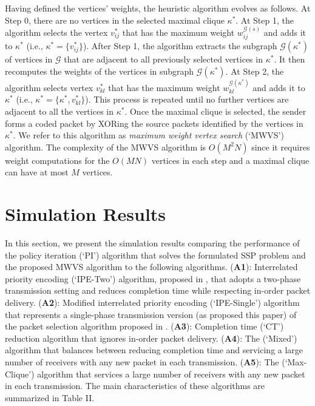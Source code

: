 \documentclass[12pt, peerreview, onecolumn]{IEEEtran}
\begin{document}
Having defined the vertices' weights,  the heuristic algorithm evolves  as follows. At Step 0,  there are no  vertices in the selected maximal clique $\kappa^*$. At Step 1, the algorithm selects the vertex $v_{ij}^*$ that has the maximum weight $w_{ij}^{\mathcal{G}(s)}$ and adds it to $\kappa^*$ (i.e., $\kappa^* = \{ v_{ij}^*\}$). After Step 1, the algorithm extracts the subgraph $\mathcal{G}(\kappa^*)$ of vertices in $\mathcal{G}$ that are adjacent to all previously selected vertices in $\kappa^*$. It then recomputes the weights of the vertices in subgraph $\mathcal{G}(\kappa^*)$. At Step 2, the algorithm selects vertex $v_{kl}^*$ that has the maximum weight $w_{kl}^{\mathcal{G}(\kappa^*)}$ and adds it to $\kappa^*$ (i.e., $\kappa^* = \{\kappa^*, v_{kl}^*\}$). This process is repeated until no further vertices are adjacent to all the  vertices  in $\kappa^*$. Once the maximal clique is selected, the sender forms  a coded packet by XORing the source packets identified by the vertices in $\kappa^*$. We refer to this algorithm as \emph{maximum weight vertex search} (`MWVS') algorithm. The  complexity of  the  MWVS algorithm is $O(M^2N)$ since it requires weight computations for the $O(MN)$ vertices  in each step and  a maximal clique can have at most $M$ vertices. 


\vspace{-5mm}
\section{Simulation Results} \label{results}
In this section, we  present the simulation results comparing  the performance of the policy iteration (`PI') algorithm that solves the formulated SSP problem  and the proposed  MWVS algorithm to the following   algorithms. (\textbf{A1}): Interrelated priority encoding   (`IPE-Two') algorithm, proposed in  \cite{wanginstantly}, that adopts a two-phase transmission setting  and  reduces completion time  while respecting in-order packet delivery.  (\textbf{A2}): Modified interrelated priority encoding   (`IPE-Single') algorithm  that represents  a single-phase transmission version (as proposed this paper) of the  packet selection algorithm proposed in  \cite{wanginstantly}.  (\textbf{A3}): Completion time   (`CT') reduction algorithm \cite{sorour2012completion}  that ignores in-order packet delivery. (\textbf{A4}):  The  (`Mixed') algorithm \cite{aboutorabenabling}  that balances between reducing  completion time and servicing a large number of receivers with any new packet in each transmission. (\textbf{A5}): The  (`Max-Clique') algorithm \cite{le2013instantly}  that services a large number of receivers with any new packet in each transmission. The main characteristics of these algorithms are summarized in Table II.
\end{document}
